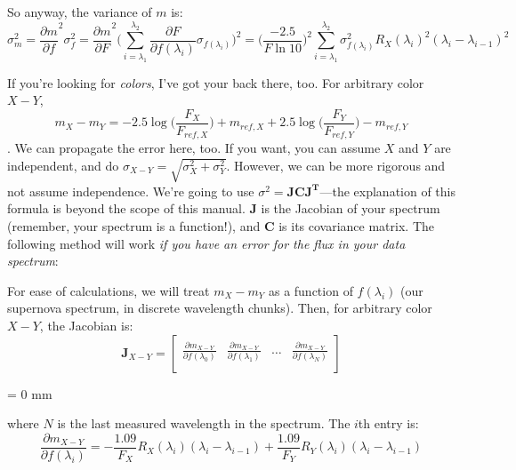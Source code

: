 So anyway, the variance of $m$ is:
\begin{equation}
    \sigma_{m}^{2} = \frac{\partial m}{\partial f}^{2} \sigma_{f}^{2} = \frac{\partial m}{\partial F}^{2} \Big( \sum_{i=\lambda_{1}}^{\lambda_{2}} \frac{\partial F}{\partial f(\lambda_{i})} \sigma_{f(\lambda_{i})}\Big)^{2} = \Big( \frac{-2.5}{F\ln10} \Big)^{2} \sum_{i=\lambda_{1}}^{\lambda_{2}}\sigma_{f(\lambda_{i})}^{2} R_{X}(\lambda_{i})^{2}(\lambda_{i}-\lambda_{i-1})^{2}
    \label{eqn:m_err}
\end{equation}

If you're looking for \textit{colors}, I've got your back there, too. For arbitrary color $X-Y$,
\begin{equation}
    m_{X} - m_{Y} = -2.5\log \Big( \frac{F_{X}}{F_{ref,X}} \Big) + m_{ref,X} + 2.5\log \Big( \frac{F_{Y}}{F_{ref,Y}} \Big) - m_{ref,Y}
\end{equation}.
We can propagate the error here, too. If you want, you can assume $X$ and $Y$ are independent, and do $\sigma_{X-Y} = \sqrt{\sigma_{X}^{2} + \sigma_{Y}^{2}}$. However, we can be more rigorous and not assume independence. We're going to use $\sigma^{2} = \mathbf{JCJ^{T}}$---the explanation of this formula is beyond the scope of this manual. $\mathbf{J}$ is the Jacobian of your spectrum (remember, your spectrum is a function!), and $\mathbf{C}$ is its covariance matrix. The following method will work \textit{if you have an error for the flux in your data spectrum}:

For ease of calculations, we will treat $m_{X}-m_{Y}$ as a function of $f(\lambda_{i})$ (our supernova spectrum, in discrete wavelength chunks). Then, for arbitrary color $X-Y$, the Jacobian is:
\begin{equation}
\label{eqn:jac2}
\mathbf{J}_{X-Y} = 
\begin{bmatrix}
    
        \frac{\partial m_{X-Y}}{\partial f(\lambda_{0})} & \frac{\partial m_{X-Y}}{\partial f (\lambda_{1})} & \dots & \frac{\partial m_{X-Y}}{\partial f(\lambda_{N})} \\
    
\end{bmatrix}
\end{equation}

\parindent = 0 mm

where $N$ is the last measured wavelength in the spectrum. The $i$th entry is: 
\begin{equation}
    \frac{\partial m_{X-Y}}{\partial f(\lambda_{i})} = -\frac{1.09}{F_{X}} R_{X}(\lambda_{i})(\lambda_{i}-\lambda_{i-1}) + \frac{1.09}{F_{Y}}R_{Y}(\lambda_{i})(\lambda_{i}-\lambda_{i-1})
\end{equation}

